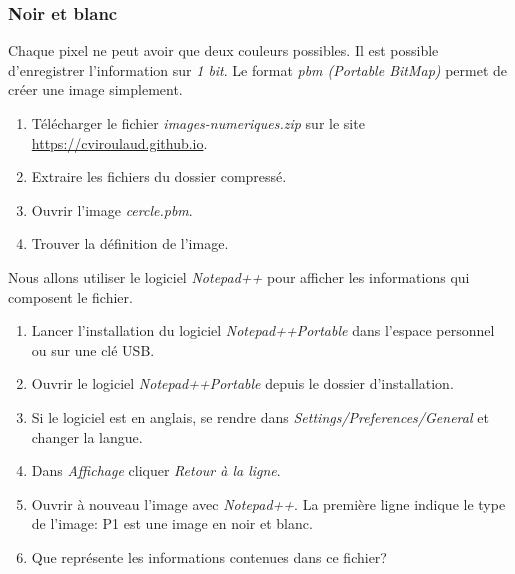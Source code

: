 \documentclass[a4paper,11pt]{article}
\begin{document}
\begin{Form}
\subsubsection{Noir et blanc}
Chaque pixel ne peut avoir que deux couleurs possibles. Il est possible d'enregistrer l'information sur \emph{1 bit}. Le format \emph{pbm (Portable BitMap)} permet de créer une image simplement.
\begin{activite}
\begin{enumerate}
\item Télécharger le fichier \emph{images-numeriques.zip} sur le site \mbox{\url{https://cviroulaud.github.io}}.
\item Extraire les fichiers du dossier compressé.
\item Ouvrir l'image \emph{cercle.pbm}.
\item Trouver la définition de l'image.
\end{enumerate}
Nous allons utiliser le logiciel \emph{Notepad++} pour afficher les informations qui composent le fichier. 
\begin{enumerate}[resume]
\item Lancer l'installation du logiciel \emph{Notepad++Portable} dans l'espace personnel ou sur une clé USB.
\item Ouvrir le logiciel \emph{Notepad++Portable} depuis le dossier d'installation.
\item Si le logiciel est en anglais, se rendre dans \emph{Settings/Preferences/General} et changer la langue.
\item Dans \emph{Affichage} cliquer \emph{Retour à la ligne}.
\item Ouvrir à nouveau l'image avec \emph{Notepad++}. La première ligne indique le type de l'image: P1 est une image en noir et blanc.
\item Que représente les informations contenues dans ce fichier?
\end{enumerate}
\end{activite}


\end{Form}
\end{document}
